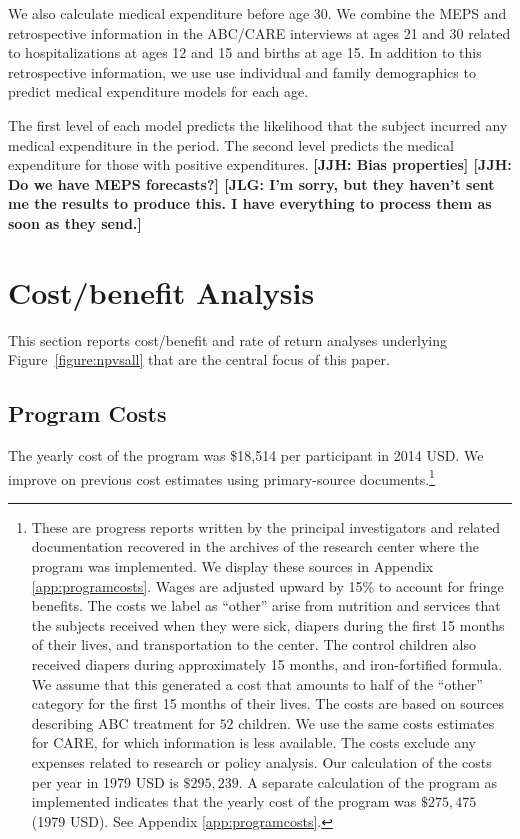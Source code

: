 We also calculate medical expenditure before age 30. We combine the MEPS and retrospective information in the ABC/CARE interviews at ages 21 and 30 related to hospitalizations at ages 12 and 15 and births at age 15. In addition to this retrospective information, we use use individual and family demographics to predict medical expenditure models for each age.

The first level of each model predicts the likelihood that the subject incurred any medical expenditure in the period. The second level predicts the medical expenditure for those with positive expenditures. \textbf{[JJH: Bias properties] [JJH: Do we have MEPS forecasts?] [JLG: I'm sorry, but they haven't sent me the results to produce this. I have everything to process them as soon as they send.]}


\section{Cost/benefit Analysis} \label{section:cbaresults}

This section reports cost/benefit and rate of return analyses underlying Figure~\ref{figure:npvsall} that are the central focus of this paper.

\subsection{Program Costs} \label{section:programscosts}

The yearly cost of the program was \$18,514 per participant in 2014 USD. We improve on previous cost estimates using primary-source documents.\footnote{These are progress reports written by the principal investigators and related documentation recovered in the archives of the research center where the program was implemented. We display these sources in Appendix \ref{app:programcosts}. Wages are adjusted upward by 15\% to account for fringe benefits. The costs we label as ``other'' arise from nutrition and services that the subjects received when they were sick, diapers during the first 15 months of their lives, and transportation to the center. The control children also received diapers during approximately 15 months, and iron-fortified formula. We assume that this generated a cost that amounts to half of the ``other'' category for the first 15 months of their lives. The costs are based on sources describing ABC treatment for $52$ children. We use the same costs estimates for CARE, for which information is less available. The costs exclude any expenses related to research or policy analysis. Our calculation of the costs per year in 1979 USD is $\$295,239$. A separate calculation of the program as implemented indicates that the yearly cost of the program was $\$275,475$ (1979 USD). See Appendix \ref{app:programcosts}.}

